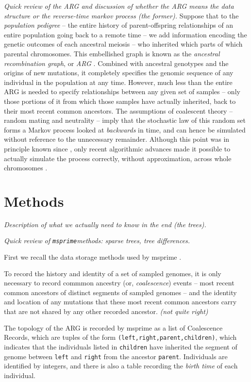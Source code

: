 \documentclass{article}
\newcommand{\msprime}{\texttt{msprime}}
\newcommand{\plr}[1]{{\em \color{blue} #1}}
\begin{document}
\plr{Quick review of the ARG and discussion of whether the ARG means the data structure or the reverse-time markov process (the former).}
Suppose that to the \emph{population pedigree} --
the entire history of parent-offspring relationships of an entire population going back to a remote time --
we add information encoding the genetic outcomes of each ancestral meiosis --
who inherited which parts of which parental chromosomes.
This embellished graph is known as the \emph{ancestral recombination graph}, or \emph{ARG} \citep{griffiths}.
Combined with ancestral genotypes and the origins of new mutations,
it completely specifies the genomic sequence of any individual in the population at any time.
However, much less than the entire ARG is needed to specify relationships between any given set of samples --
only those portions of it from which those samples have actually inherited, back to their most recent common ancestors.
The assumptions of coalescent theory -- random mating and neutrality --
imply that the stochastic law of this random set forms a Markov process looked at \emph{backwards} in time,
and can hence be simulated without reference to the unnecessary remainder.
Although this point was in principle known since \citet{griffithsmarjoram},
only recent algorithmic advances made it possible to actually simulate the process correctly,
without approximation, across whole chromosomes \citep{msprime}.



\section*{Methods}

\plr{Description of what we actually need to know in the end (the trees).}

\plr{Quick review of \msprime methods: sparse trees, tree differences.}

First we recall the data storage methods used by msprime \citep[see][for more details]{msprime}.

To record the history and identity of a set of sampled genomes,
it is only necessary to record commmon ancestry (or, \emph{coalescence}) events --
most recent common ancestors of distinct segments of sampled genomes --
and the identity and location of any mutations that these most recent common ancestors carry
that are not shared by any other recorded ancestor.
\plr{(not quite right)}

The topology of the ARG
is recorded by msprime as a list of Coalescence Records, which are tuples of the form
\texttt{(left,right,parent,children)},
which indicates that the individuals listed in \texttt{children}
have inherited the segment of genome between \texttt{left} and \texttt{right}
from the ancestor \texttt{parent}.
Individuals are identified by integers,
and there is also a table recording the \emph{birth time} of each individual.
\end{document}

